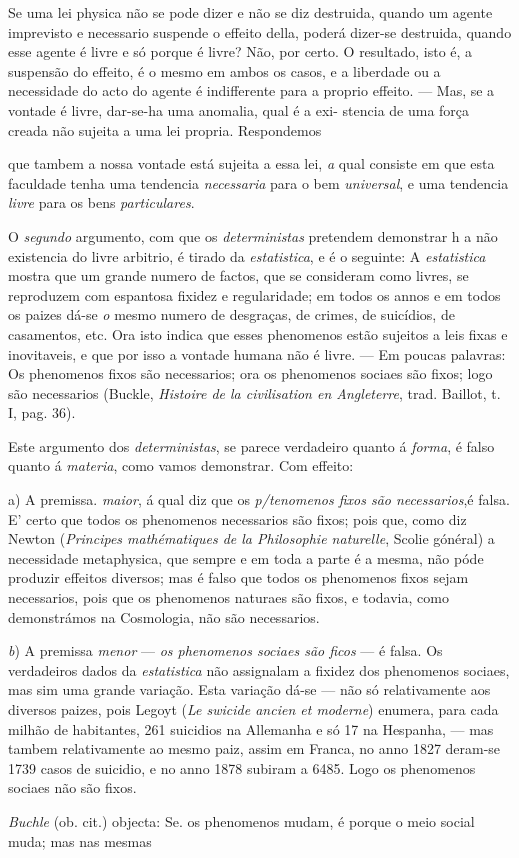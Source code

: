 Se uma lei physica não se pode dizer e não se diz destruida, quando um agente imprevisto e necessario suspende o effeito della, poderá dizer-se destruida, quando esse agente é livre e só porque é livre? Não, por certo. O resultado, isto é, a suspensão do effeito, é o mesmo em ambos os casos, e a \textbar{} liberdade ou a necessidade do acto do agente é indifferente para a proprio \textbar{} effeito. --- Mas, se a vontade é livre, dar-se-ha uma anomalia, qual é a exi- \textbar{} stencia de uma força creada não sujeita a uma lei propria. Respondemos \textbar{}\par que tambem a nossa vontade está sujeita a essa lei, \emph{a} qual consiste em que esta faculdade tenha uma tendencia \emph{necessaria} para o bem \emph{universal}, e uma tendencia \emph{livre} para os bens \emph{particulares}.\par O \emph{segundo} argumento, com que os \emph{deterministas} pretendem demonstrar h a não existencia do livre arbitrio, é tirado da \emph{estatistica}, e é o seguinte: A \emph{estatistica} mostra que um grande numero de factos, que se consideram como livres, se reproduzem com espantosa fixidez e regularidade; em todos os annos e em todos os paizes dá-se \emph{o} mesmo numero de desgraças, de crimes, de suicídios, de casamentos, etc. Ora isto indica que esses phenomenos estão \textbar{} sujeitos a leis fixas e inovitaveis, e que por isso a vontade humana não é livre. --- Em poucas palavras: Os phenomenos fixos são necessarios; ora os phenomenos sociaes são fixos; logo são necessarios (Buckle, \emph{Histoire de la civilisation en Angleterre}, trad. Baillot, t. I, pag. 36).\par Este argumento dos \emph{deterministas}, se parece verdadeiro quanto á \emph{forma}, é falso quanto á \emph{materia}, como vamos demonstrar. Com effeito:\par a) A premissa. \emph{maior}, á qual diz que os \emph{p/tenomenos fixos são necessarios},é falsa. E' certo que todos os phenomenos necessarios são fixos; pois que, como diz Newton (\emph{Principes mathématiques de la Philosophie naturelle}, Scolie gónéral) a necessidade metaphysica, que sempre e em toda a parte é a mesma, não póde produzir effeitos diversos; mas é falso que todos os phenomenos fixos sejam necessarios, pois que os phenomenos naturaes são fixos, e todavia, como demonstrámos na Cosmologia, não são necessarios.\par \emph{b}) A premissa \emph{menor} --- \emph{os phenomenos sociaes são ficos} --- é falsa. Os verdadeiros dados da \emph{estatistica} não assignalam a fixidez dos phenomenos sociaes, mas sim uma grande variação. Esta variação dá-se --- não só relativamente aos diversos paizes, pois Legoyt (\emph{Le swicide ancien et moderne}) enumera, para cada milhão de habitantes, 261 suicidios na Allemanha e só 17 na Hespanha, --- mas tambem relativamente ao mesmo paiz, assim em Franca, no anno 1827 deram-se 1739 casos de suicidio, e no anno 1878 subiram a 6485. Logo os phenomenos sociaes não são fixos.\par \emph{Buchle} (ob. cit.) objecta: Se. os phenomenos mudam, é porque o meio social muda; mas nas mesmas 